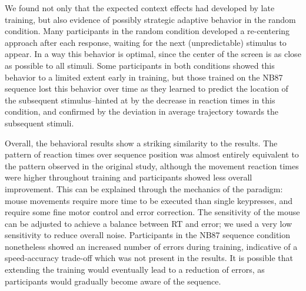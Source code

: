 \documentclass[man,floatsintext]{apa6}
\begin{document}
We found not only that the expected context effects had developed by late training, but also evidence of possibly strategic adaptive behavior in the random condition. Many participants in the random condition developed a re-centering approach after each response, waiting for the next (unpredictable) stimulus to appear. In a way this behavior is optimal, since the center of the screen is as close as possible to all stimuli. Some participants in both conditions showed this behavior to a limited extent early in training, but those trained on the NB87 sequence lost this behavior over time as they learned to predict the location of the subsequent stimulus--hinted at by the decrease in reaction times in this condition, and confirmed by the deviation in average trajectory towards the subsequent stimuli.

Overall, the behavioral results show a striking similarity to the  results. The pattern of reaction times over sequence position was almost entirely equivalent to the pattern observed in the original study, although the movement reaction times were higher throughout training and participants showed less overall improvement. This can be explained through the mechanics of the paradigm: mouse movements require more time to be executed than single keypresses, and require some fine motor control and error correction. The sensitivity of the mouse can be adjusted to achieve a balance between RT and error; we used a very low sensitivity to reduce overall noise. Participants in the NB87 sequence condition nonetheless showed an increased number of errors during training, indicative of a speed-accuracy trade-off which was not present in the  results. It is possible that extending the training would eventually lead to a reduction of errors, as participants would gradually become aware of the sequence. 

\end{document}
